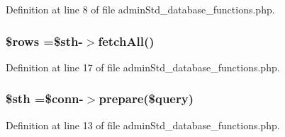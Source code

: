Definition at line 8 of file admin\-Std\-\_\-database\-\_\-functions.\-php.

\hypertarget{admin_std__database__functions_8php_ace2ec39e7df3899fa8df9640ec274b03}{
\subsubsection[{\$rows}]{\setlength{\rightskip}{0pt plus 5cm}\$rows =\$sth-\/$>$fetch\-All()}}\label{admin_std__database__functions_8php_ace2ec39e7df3899fa8df9640ec274b03}


Definition at line 17 of file admin\-Std\-\_\-database\-\_\-functions.\-php.

\hypertarget{admin_std__database__functions_8php_afa9126f9664959c02795be300a135f93}{
\subsubsection[{\$sth}]{\setlength{\rightskip}{0pt plus 5cm}\$sth =\$conn-\/$>$prepare(\$query)}}\label{admin_std__database__functions_8php_afa9126f9664959c02795be300a135f93}


Definition at line 13 of file admin\-Std\-\_\-database\-\_\-functions.\-php.

